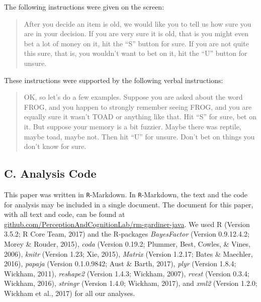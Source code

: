 \documentclass[english,,man]{apa6}
\begin{document}
The following instructions were given on the screen:

\begin{quote}After you decide an item is old, we would like you to tell us how sure you are in your
decision. If you are very sure it is old, that is you might even bet a lot of money on
it, hit the ``S” button for sure. If you are not quite this sure, that is, you wouldn't
want to bet on it, hit the ``U” button for unsure.
\end{quote}

These instructions were supported by the following verbal instructions:

\begin{quote}OK, so let's do a few examples. Suppose you are asked about the word FROG, and
you happen to strongly remember seeing FROG, and you are equally sure it wasn't
TOAD or anything like that. Hit ``S” for sure, bet on it. But suppose your memory is a bit
fuzzier. Maybe there was reptile, maybe toad, maybe not. Then hit ``U” for unsure.
Don't bet on things you don't know for sure.
\end{quote}

\newpage

\hypertarget{c.-analysis-code}{%
\subsection{C. Analysis Code}\label{c.-analysis-code}}

This paper was written in \texttt{R}-Markdown. In \texttt{R}-Markdown, the text and the code for analysis may be included in a single document. The document for this paper, with all text and code, can be found at \href{https://github.com/PerceptionAndCognitionLab/rm-gardiner-java/tree/public/papers/current}{github.com/PerceptionAndCognitionLab/rm-gardiner-java}. We used R (Version 3.5.2; R Core Team, 2017) and the R-packages \emph{BayesFactor} (Version 0.9.12.4.2; Morey \& Rouder, 2015), \emph{coda} (Version 0.19.2; Plummer, Best, Cowles, \& Vines, 2006), \emph{knitr} (Version 1.23; Xie, 2015), \emph{Matrix} (Version 1.2.17; Bates \& Maechler, 2016), \emph{papaja} (Version 0.1.0.9842; Aust \& Barth, 2017), \emph{plyr} (Version 1.8.4; Wickham, 2011), \emph{reshape2} (Version 1.4.3; Wickham, 2007), \emph{rvest} (Version 0.3.4; Wickham, 2016), \emph{stringr} (Version 1.4.0; Wickham, 2017), and \emph{xml2} (Version 1.2.0; Wickham et al., 2017) for all our analyses.
\end{document}
